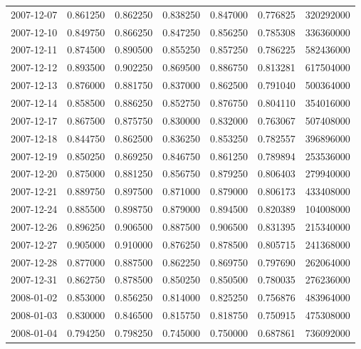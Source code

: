 \begin{tabular}{lrrrrrr}
2007-12-07 &    0.861250 &    0.862250 &    0.838250 &    0.847000 &    0.776825 &   320292000 \\
2007-12-10 &    0.849750 &    0.866250 &    0.847250 &    0.856250 &    0.785308 &   336360000 \\
2007-12-11 &    0.874500 &    0.890500 &    0.855250 &    0.857250 &    0.786225 &   582436000 \\
2007-12-12 &    0.893500 &    0.902250 &    0.869500 &    0.886750 &    0.813281 &   617504000 \\
2007-12-13 &    0.876000 &    0.881750 &    0.837000 &    0.862500 &    0.791040 &   500364000 \\
2007-12-14 &    0.858500 &    0.886250 &    0.852750 &    0.876750 &    0.804110 &   354016000 \\
2007-12-17 &    0.867500 &    0.875750 &    0.830000 &    0.832000 &    0.763067 &   507408000 \\
2007-12-18 &    0.844750 &    0.862500 &    0.836250 &    0.853250 &    0.782557 &   396896000 \\
2007-12-19 &    0.850250 &    0.869250 &    0.846750 &    0.861250 &    0.789894 &   253536000 \\
2007-12-20 &    0.875000 &    0.881250 &    0.856750 &    0.879250 &    0.806403 &   279940000 \\
2007-12-21 &    0.889750 &    0.897500 &    0.871000 &    0.879000 &    0.806173 &   433408000 \\
2007-12-24 &    0.885500 &    0.898750 &    0.879000 &    0.894500 &    0.820389 &   104008000 \\
2007-12-26 &    0.896250 &    0.906500 &    0.887500 &    0.906500 &    0.831395 &   215340000 \\
2007-12-27 &    0.905000 &    0.910000 &    0.876250 &    0.878500 &    0.805715 &   241368000 \\
2007-12-28 &    0.877000 &    0.887500 &    0.862250 &    0.869750 &    0.797690 &   262064000 \\
2007-12-31 &    0.862750 &    0.878500 &    0.850250 &    0.850500 &    0.780035 &   276236000 \\
2008-01-02 &    0.853000 &    0.856250 &    0.814000 &    0.825250 &    0.756876 &   483964000 \\
2008-01-03 &    0.830000 &    0.846500 &    0.815750 &    0.818750 &    0.750915 &   475308000 \\
2008-01-04 &    0.794250 &    0.798250 &    0.745000 &    0.750000 &    0.687861 &   736092000 \\

\end{tabular}
